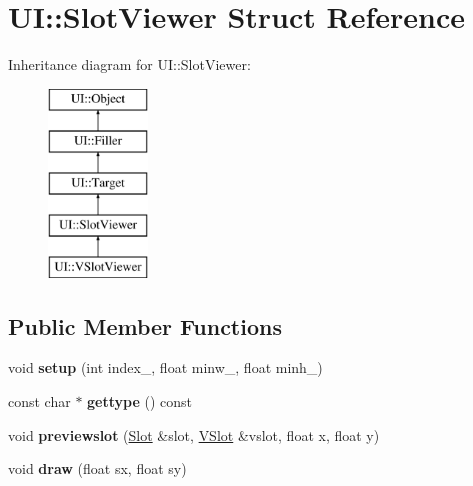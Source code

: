 \hypertarget{struct_u_i_1_1_slot_viewer}{}\section{UI\+:\+:Slot\+Viewer Struct Reference}
\label{struct_u_i_1_1_slot_viewer}
Inheritance diagram for UI\+:\+:Slot\+Viewer\+:\begin{figure}[H]
\begin{center}
\leavevmode
\includegraphics[height=5.000000cm]{struct_u_i_1_1_slot_viewer}
\end{center}
\end{figure}
\subsection*{Public Member Functions}
\begin{DoxyCompactItemize}
\item 
\mbox{\label{struct_u_i_1_1_slot_viewer_acfc1f412c7d1d015b99fd98f0fe81664}} 
void {\bfseries setup} (int index\+\_\+, float minw\+\_, float minh\+\_)
\item 
\mbox{\label{struct_u_i_1_1_slot_viewer_ad4cc2e48b32910d7df71800c3e550056}} 
const char $\ast$ {\bfseries gettype} () const
\item 
\mbox{\label{struct_u_i_1_1_slot_viewer_afd789ded2687f7a4c7770e81be94e619}} 
void {\bfseries previewslot} (\hyperlink{struct_slot}{Slot} \&slot, \hyperlink{struct_v_slot}{V\+Slot} \&vslot, float x, float y)
\item 
\mbox{\label{struct_u_i_1_1_slot_viewer_aa9b21235153ab75b992da581e2835414}} 
void {\bfseries draw} (float sx, float sy)
\end{DoxyCompactItemize}
